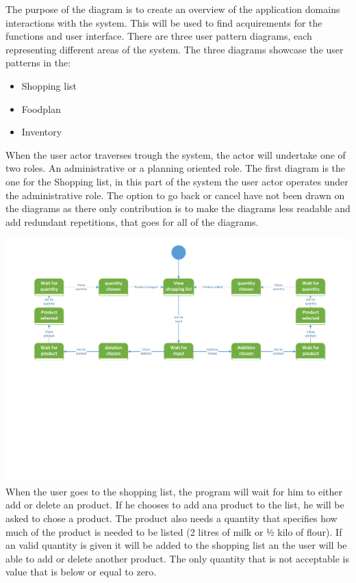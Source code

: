 The purpose of the diagram is to create an overview of the application domains interactions with the system. This will be used to find acquirements for the functions and user interface. There are three user pattern diagrams, each representing different areas of the system. The three diagrams showcase the user patterns in the:
\begin{itemize}
\item{Shopping list}
\item{Foodplan}
\item{Inventory}
\end{itemize}

When the user actor traverses trough the system, the actor will undertake one of two roles. An administrative or a planning oriented role.
The first diagram is the one for the Shopping list, in this part of the system the user actor operates under the administrative role.
The option to go back or cancel have not been drawn on the diagrams as there only contribution is to make the diagrams less readable and add redundant repetitions, that goes for all of the diagrams.

\includegraphics[width=1.0\textwidth]{ApplicationDomain/upShoppingList.pdf} \label{Shopping_List_Figure}
When the user goes to the shopping list, the program will wait for him to either add or delete an product. If he chooses to add ana product to the list, he will be asked to chose a product. The product also needs a quantity that specifies how much of the product is needed to be listed (2 litres of milk or ½ kilo of flour). If an valid quantity is given it will be added to the shopping list an the user will be able to add or delete another product. The only quantity that is not acceptable is value that is below or equal to zero.

